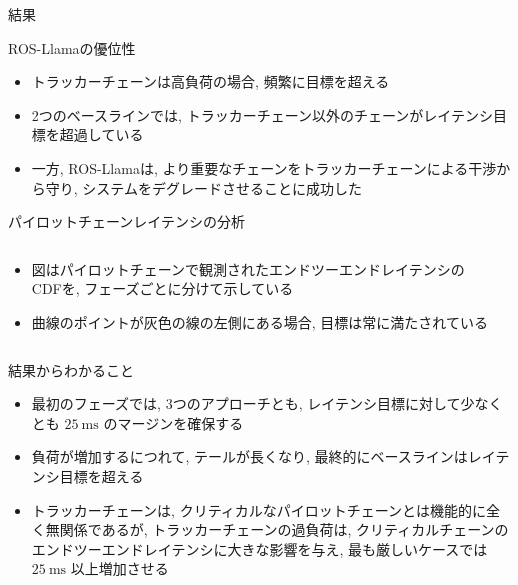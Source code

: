 \begin{frame}{結果}
\end{frame}

\begin{frame}{ROS-Llamaの優位性}
    \begin{itemize}
        \item トラッカーチェーンは高負荷の場合, 頻繁に目標を超える
        \item 2つのベースラインでは, トラッカーチェーン以外のチェーンがレイテンシ目標を超過している
        \item 一方, ROS-Llamaは, より重要なチェーンをトラッカーチェーンによる干渉から守り, システムをデグレードさせることに成功した
    \end{itemize}
\end{frame}

\begin{frame}{パイロットチェーンレイテンシの分析}
    \begin{columns}
        \begin{column}{0.5\textwidth}
            \begin{itemize}
                \item 図はパイロットチェーンで観測されたエンドツーエンドレイテンシのCDFを, フェーズごとに分けて示している
                \item 曲線のポイントが灰色の線の左側にある場合, 目標は常に満たされている
            \end{itemize}
        \end{column}
        \begin{column}{0.5\textwidth}
        \end{column}
    \end{columns}
\end{frame}

\begin{frame}{結果からわかること}
    \begin{itemize}
        \item 最初のフェーズでは, 3つのアプローチとも, レイテンシ目標に対して少なくとも $25 \mathrm{~ms}$ のマージンを確保する
        \item 負荷が増加するにつれて, テールが長くなり, 最終的にベースラインはレイテンシ目標を超える
        \item トラッカーチェーンは, クリティカルなパイロットチェーンとは機能的に全く無関係であるが, トラッカーチェーンの過負荷は, クリティカルチェーンのエンドツーエンドレイテンシに大きな影響を与え, 最も厳しいケースでは $25 \mathrm{~ms}$ 以上増加させる
    \end{itemize}
\end{frame}

